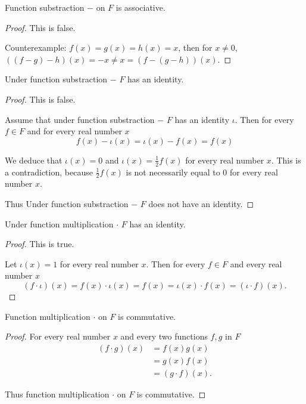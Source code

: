 \newpage
\begin{exercise}
    Function substraction $-$ on $F$ is associative.
\end{exercise}

\begin{proof}
    This is false.

    Counterexample: $f(x) = g(x) = h(x) = x$, then for $x\ne 0$, $((f - g) - h)(x) = -x \ne x = (f - (g - h))(x)$.
\end{proof}

\newpage
\begin{exercise}
    Under function substraction $-$ $F$ has an identity.
\end{exercise}

\begin{proof}
    This is false.

    Assume that under function substraction $-$ $F$ has an identity $\iota$. Then for every $f\in F$ and for every real number $x$
    \[
        f(x) - \iota(x) = \iota(x) - f(x) = f(x)
    \]

    We deduce that $\iota(x) = 0$ and $\iota(x) = \frac{1}{2}f(x)$ for every real number $x$. This is a contradiction, because $\frac{1}{2}f(x)$ is not necessarily equal to $0$ for every real number $x$.

    Thus Under function substraction $-$ $F$ does not have an identity.
\end{proof}

\newpage
\begin{exercise}
    Under function multiplication $\cdot$ $F$ has an identity.
\end{exercise}

\begin{proof}
    This is true.

    Let $\iota(x) = 1$ for every real number $x$. Then for every $f\in F$ and every real number $x$
    \[
        (f\cdot \iota)(x) = f(x)\cdot \iota(x) = f(x) = \iota(x)\cdot f(x) = (\iota\cdot f)(x).
    \]
\end{proof}

\newpage
\begin{exercise}
    Function multiplication $\cdot$ on $F$ is commutative.
\end{exercise}

\begin{proof}
    For every real number $x$ and every two functions $f, g$ in $F$
    \begin{align*}
        (f\cdot g)(x) & = f(x)g(x)       \\
                      & = g(x)f(x)       \\
                      & = (g\cdot f)(x).
    \end{align*}

    Thus function multiplication $\cdot$ on $F$ is commutative.
\end{proof}

